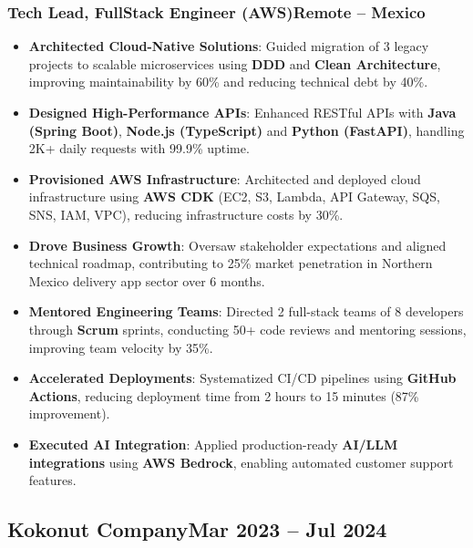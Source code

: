 \documentclass[a4paper,10pt]{article}
\newcommand{\kw}[1]{\textbf{\textcolor{keyword}{#1}}}
\newcommand{\tech}[1]{\textbf{\textcolor{tech}{#1}}}
\begin{document}
\subsubsection*{\small Tech Lead, FullStack Engineer (AWS)\hfill Remote -- Mexico}
\begin{itemize}[noitemsep, leftmargin=*]
    \item \textbf{Architected Cloud-Native Solutions}: Guided migration of 3 legacy projects to scalable microservices using \kw{DDD} and \kw{Clean Architecture}, improving maintainability by 60\% and reducing technical debt by 40\%.
    \item \textbf{Designed High-Performance APIs}: Enhanced RESTful APIs with \tech{Java (Spring Boot)}, \tech{Node.js (TypeScript)} and \tech{Python (FastAPI)}, handling 2K+ daily requests with 99.9\% uptime.
    \item \textbf{Provisioned AWS Infrastructure}: Architected and deployed cloud infrastructure using \tech{AWS CDK} (EC2, S3, Lambda, API Gateway, SQS, SNS, IAM, VPC), reducing infrastructure costs by 30\%.
    \item \textbf{Drove Business Growth}: Oversaw stakeholder expectations and aligned technical roadmap, contributing to 25\% market penetration in Northern Mexico delivery app sector over 6 months.
    \item \textbf{Mentored Engineering Teams}: Directed 2 full-stack teams of 8 developers through \kw{Scrum} sprints, conducting 50+ code reviews and mentoring sessions, improving team velocity by 35\%.
    \item \textbf{Accelerated Deployments}: Systematized CI/CD pipelines using \tech{GitHub Actions}, reducing deployment time from 2 hours to 15 minutes (87\% improvement).
    \item \textbf{Executed AI Integration}: Applied production-ready \kw{AI/LLM integrations} using \tech{AWS Bedrock}, enabling automated customer support features.
\end{itemize}

\subsection*{\small Kokonut Company\hfill\textbf{Mar 2023 -- Jul 2024}}
\end{document}
